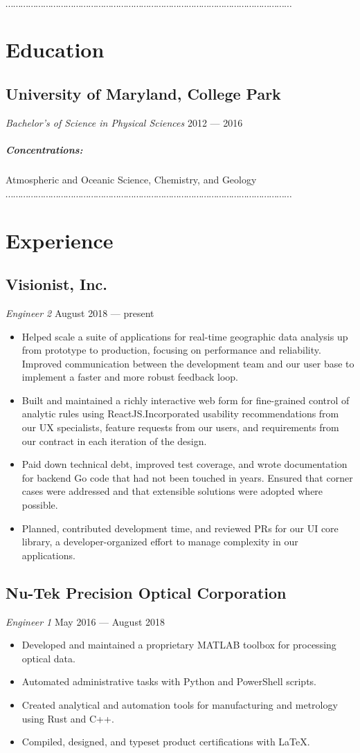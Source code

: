 \documentclass[10pt]{article}
\newcommand{\dotfringe}{
    \begin{center}
      $\cdots\cdots\cdots\cdots\cdots\cdots\cdots\cdots\cdots\cdots\cdots\cdots\cdots\cdots\cdots\cdots\cdots\cdots\cdots\cdots\cdots\cdots\cdots\cdots\cdots\cdots\cdots\cdots\cdots\cdots\cdots\cdots\cdots\cdots\cdots\cdots\cdots\cdots$
    \end{center}
}
\begin{document}

\dotfringe{}

\section*{Education}
\subsection*{University of Maryland, College Park}
\textit{Bachelor's of Science in Physical Sciences} \hfill 2012 --- 2016

\subparagraph{Concentrations:} Atmospheric and Oceanic Science, Chemistry, and
Geology

\dotfringe{}

\section*{Experience}
\subsection*{Visionist, Inc.}
\textit{Engineer 2} \hfill August 2018 --- present
\begin{itemize}
  \item Helped scale a suite of applications for real-time geographic data
    analysis up from prototype to production, focusing on performance and
    reliability. Improved communication between the development team and our
    user base to implement a faster and more robust feedback loop.
  \item Built and maintained a richly interactive web form for fine-grained
    control of analytic rules using ReactJS.\@ Incorporated usability
    recommendations from our UX specialists, feature requests from our users,
    and requirements from our contract in each iteration of the design.
  \item Paid down technical debt, improved test coverage, and wrote
    documentation for backend Go code that had not been touched in years.
    Ensured that corner cases were addressed and that extensible solutions were
    adopted where possible.
  \item Planned, contributed development time, and reviewed PRs for our UI core
    library, a developer-organized effort to manage complexity in our
    applications.
\end{itemize}
\subsection*{Nu-Tek Precision Optical Corporation}
\textit{Engineer 1} \hfill May 2016 --- August 2018
\begin{itemize}
  \item Developed and maintained a proprietary MATLAB toolbox for processing optical data.
  \item Automated administrative tasks with Python and PowerShell scripts.
  \item Created analytical and automation tools for manufacturing and metrology using Rust and C++.
  \item Compiled, designed, and typeset product certifications with \LaTeX.
\end{itemize}
\end{document}
